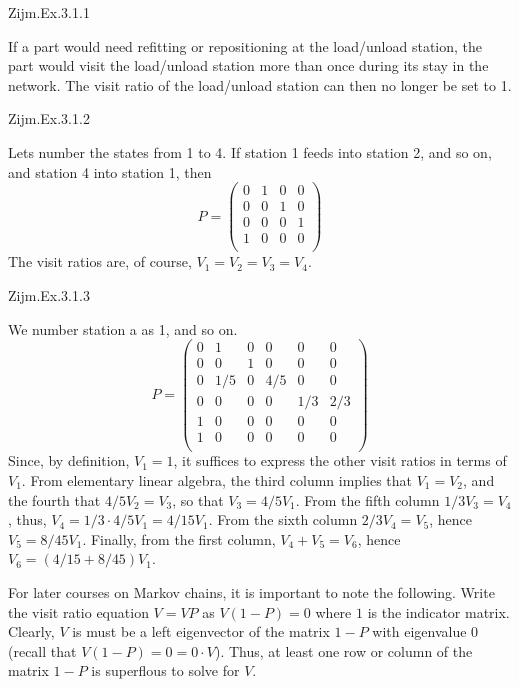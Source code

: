 \begin{question}
Zijm.Ex.3.1.1 
\begin{solution}
If a part would need refitting or repositioning at the load/unload station, the part would visit the load/unload station more than once during its stay in the network. The visit ratio of the load/unload station can then no longer be set to 1.
\end{solution}
\end{question}

\begin{question}
Zijm.Ex.3.1.2
\begin{solution}
Lets number the states from 1 to 4. If station 1 feeds into station 2, and so on, and station 4 into station 1, then 
\begin{equation*}
  P = 
  \begin{pmatrix}
    0 & 1 & 0 & 0\\
    0 & 0 & 1 & 0\\
    0 & 0 & 0 & 1\\
    1 & 0 & 0 & 0\\
  \end{pmatrix}
\end{equation*}
The visit ratios are, of course, $V_1= V_2 = V_3 = V_4$. 
\end{solution}
\end{question}

\begin{question}
Zijm.Ex.3.1.3
\begin{solution}
We number  station a as 1, and so on.
\begin{equation*}
  P = 
  \begin{pmatrix}
    0 & 1 & 0 & 0 & 0 & 0 \\
    0 & 0 & 1 & 0 & 0 & 0 \\
    0 & 1/5 & 0 & 4/5 & 0 & 0\\
    0 & 0& 0 & 0 & 1/3 & 2/3 \\
    1 & 0 & 0 & 0 & 0 & 0\\
    1 & 0 & 0 & 0 & 0 & 0\\
  \end{pmatrix}
\end{equation*}
Since, by definition, $V_1=1$, it suffices to express the other visit
ratios in terms of $V_1$. From elementary linear algebra, the third
column implies that $V_1 = V_2$, and the fourth that $4/5 V_2 = V_3$,
so that $V_3 = 4/5 V_1$. From the fifth column $1/3 V_3=V_4$, thus,
$V_4 = 1/3 \cdot 4/5 V_1 = 4/15 V_1$.  From the sixth column
$2/3 V_4 = V_5$, hence $V_5 = 8/45 V_1$. Finally, from the first
column, $V_4+V_5 = V_6$, hence $V_6 = (4/15 + 8/45)V_1$. 

For later courses on Markov chains, it is important to note the
following. Write the visit ratio equation $V = VP$ as $V(1-P)=0$ where
$1$ is the indicator matrix. Clearly, $V$ is must be a left
eigenvector of the matrix $1-P$ with eigenvalue 0 (recall that
$V(1-P) = 0 = 0\cdot V$). Thus, at least one row or column of the matrix $1-P$ is superflous to solve for $V$. 
\end{solution}
\end{question}

